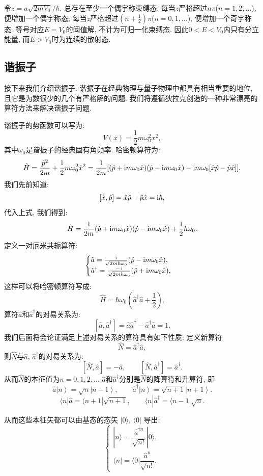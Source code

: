 令$z=a\sqrt{2mV_0}/\hbar$. 总存在至少一个偶宇称束缚态; 每当$z$严格超过$n\pi$($n=1,2,\ldots$), 便增加一个偶宇称态; 每当$z$严格超过$(n+\tfrac12)\pi$($n=0,1,\ldots$), 便增加一个奇宇称态. 等号对应$E=V_0$的阈值解, 不计为可归一化束缚态. 因此$0<E<V_0$内只有分立能量, 而$E>V_0$时为连续的散射态.

\subsection{谐振子}
接下来我们介绍谐振子. 谐振子在经典物理与量子物理中都具有相当重要的地位, 且它是为数很少的几个有严格解的问题. 我们将遵循狄拉克创造的一种非常漂亮的算符方法来解决谐振子问题.

谐振子的势函数可以写为:
\[
V(x) = \frac{1}{2}m\omega_0^2 x^2,
\]
其中$\omega_0$是谐振子的经典固有角频率. 哈密顿算符为:
\[
\hat{H} = \frac{\hat{p}^2}{2m} + \frac{1}{2}m\omega_0^2 \hat{x}^2 = \frac{1}{2m}[(\hat{p}+\mathop{}\!\mathrm{i} m\omega_0 \hat{x})(\hat{p}-\mathop{}\!\mathrm{i} m\omega_0 \hat{x}) - \mathop{}\!\mathrm{i} m\omega_0 [\hat{x}\hat{p}-\hat{p}\hat{x}]].
\]
我们先前知道:
\[
[\hat{x}, \hat{p}] = \hat{x}\hat{p}-\hat{p}\hat{x} = \mathop{}\!\mathrm{i}\hbar,
\]
代入上式, 我们得到:
\[
\hat{H} = \frac{1}{2m}(\hat{p}+\mathop{}\!\mathrm{i} m\omega_0 \hat{x})(\hat{p}-\mathop{}\!\mathrm{i} m\omega_0 \hat{x}) + \frac{1}{2}\hbar\omega_0.
\]
定义一对厄米共轭算符:
\[
\begin{cases}
\hat{a} = \frac{\mathop{}\!\mathrm{i}}{\sqrt{2m\hbar\omega_0}}(\hat{p}-\mathop{}\!\mathrm{i} m\omega_0 \hat{x}), \\
\hat{a}^{\dagger} = \frac{-\mathop{}\!\mathrm{i}}{\sqrt{2m\hbar\omega_0}}(\hat{p}+\mathop{}\!\mathrm{i} m\omega_0 \hat{x}),
\end{cases}
\]
这样可以将哈密顿算符写成:
\[
\hat{H} = \hbar\omega_0(\hat{a}^{\dagger}\hat{a} + \frac{1}{2}).
\]
算符$\hat{a}$和$\hat{a}^{\dagger}$的对易关系为:
\[
[\hat{a}, \hat{a}^{\dagger}] = \hat{a}\hat{a}^{\dagger} - \hat{a}^{\dagger}\hat{a} = 1.
\]
我们后面将会论证满足上述对易关系的算符具有如下性质: 定义新算符
\[
\hat{N} = \hat{a}^{\dagger}\hat{a},
\]
则$\hat{N}$与$\hat{a}$, $\hat{a}^{\dagger}$的对易关系为:
\[
[\hat{N}, \hat{a}] = -\hat{a}, \qquad [\hat{N}, \hat{a}^{\dagger}] = \hat{a}^{\dagger}.
\]
从而$\hat{N}$的本征值为$n=0, 1, 2, \ldots$
$\hat{a}$和$\hat{a}^{\dagger}$分别是$\hat{N}$的降算符和升算符, 即
\[
\hat{a}\left|n\right\rangle = \sqrt{n}\left|n-1\right\rangle, \qquad \hat{a}^{\dagger}\left|n\right\rangle = \sqrt{n+1}\left|n+1\right\rangle.
\]
\[
\langle n|\hat{a} = \langle n+1|\sqrt{n+1}, \qquad
\langle n|\hat{a}^{\dagger} = \langle n-1|\sqrt{n}.
\]

从而这些本征矢都可以由基态的态矢 $|0\rangle$, $\langle 0|$ 导出:
\[
\begin{cases}
|n\rangle = \dfrac{\hat{a}^{\dagger n}}{\sqrt{n!}}|0\rangle, \\[6pt]
\langle n| = \langle 0|\dfrac{\hat{a}^{n}}{\sqrt{n!}}.
\end{cases}
\]

